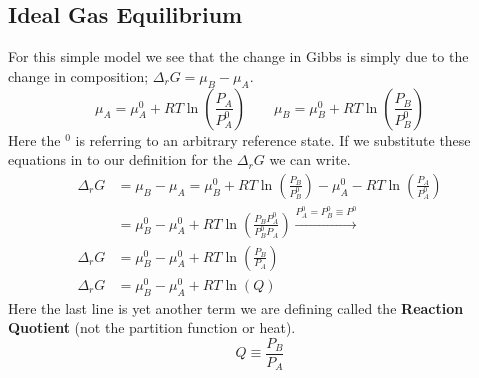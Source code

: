 \documentclass{article}
\begin{document}
\subsection*{Ideal Gas Equilibrium}
For this simple model we see that the change in Gibbs is simply due to the change in composition; $\Delta_rG = \mu_B - \mu_A$.
\begin{equation}
\mu_A = \mu_A^0 + RT \ln\left(\frac{P_A}{P_A^0}\right) \qquad \mu_B = \mu_B^0 + RT \ln\left(\frac{P_B}{P_B^0}\right)
\end{equation}
Here the $^0$ is referring to an arbitrary reference state. 
If we substitute these equations in to our definition for the $\Delta _rG$ we can write. 
\begin{equation}
\begin{split}
    \Delta_rG &= \mu_B - \mu_A = \mu_B^0 + RT \ln\left(\frac{P_B}{P_B^0}\right) - \mu_A^0 - RT \ln\left(\frac{P_A}{P_A^0}\right) \\
    &= \mu_B^0 - \mu_A^0 + RT\ln\left(\frac{P_B P_A^0}{P_B^0 P_A}\right) \xrightarrow{P_A^0 = P_B^0 \equiv P^0} \\
    \Delta_rG &= \mu_B^0 - \mu_A^0 + RT\ln\left(\frac{P_B }{P_A}\right) \\
    \Delta_rG &= \mu_B^0 - \mu_A^0 + RT\ln\left(Q\right)
\end{split}
\end{equation}
Here the last line is yet another term we are defining called the \textbf{Reaction Quotient} (not the partition function or heat). 
\begin{equation}
Q \equiv \frac{P_B}{P_A}
\end{equation}
\end{document}
